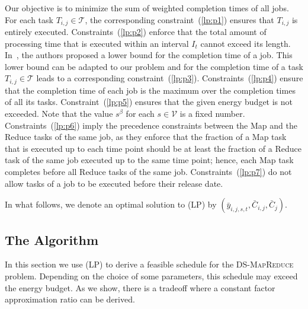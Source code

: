 \documentclass{llncs}
\newcommand{\dmr}{\textsc{DS-MapReduce}\xspace}
\begin{document}
Our objective is to minimize the sum of weighted completion times of all jobs.
For each task $T_{i,j} \in \mathcal{T}$, the corresponding constraint~(\ref{lp:p1}) ensures that $T_{i,j}$ is entirely executed.
Constraints~(\ref{lp:p2}) enforce that the total amount of processing time that is executed within an interval $I_t$ cannot exceed its length.
In~\cite{SchulzS02}, the authors proposed a lower bound for the completion time of a job.
This lower bound can be adapted to our problem and for the completion time
of a task $T_{i,j} \in \mathcal{T}$ leads to a corresponding constraint~(\ref{lp:p3}).
Constraints~(\ref{lp:p4}) ensure that the completion time of each job is the maximum over the completion times of all its tasks.
Constraint~(\ref{lp:p5}) ensures that the given energy budget is not exceeded.
Note that the value $s^{\beta}$ for each $s \in \mathcal{V}$ is a fixed number.
Constraints~(\ref{lp:p6}) imply the precedence constraints between the Map and the Reduce tasks of the same job,
as they enforce that the fraction of a Map task that is executed up to each time point
should be at least the fraction of a Reduce task of the same job executed up to the same time point;
hence, each Map task completes before all Reduce tasks of the same job.
Constraints~(\ref{lp:p7}) do not allow tasks of a job to be executed before their release date.


In what follows, we denote an optimal solution to (LP) by $(\bar{y}_{i,j,s,t}, \bar{C}_{i,j}, \bar{C}_j)$.

\subsection{The Algorithm}

In this section we use (LP) to derive a feasible schedule for the \dmr problem.
Depending on the choice of some parameters, this schedule may exceed the energy budget.
As we show, there is a tradeoff where a constant factor approximation ratio can be derived.
\end{document}
